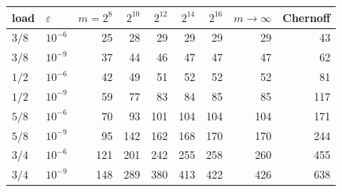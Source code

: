 \begin{tabular}{|l|l|r|r|r|r|r|r|r|}
\hline
load & $\varepsilon$ & $m{=}2^{8}$ & $2^{10}$ & $2^{12}$ & $2^{14}$ & $2^{16}$ & $m\to\infty$ & Chernoff \\
\hline
$3/8$ & $10^{-6}$ & 25 & 28 & 29 & 29 & 29 & 29 & 43 \\
$3/8$ & $10^{-9}$ & 37 & 44 & 46 & 47 & 47 & 47 & 62 \\
$1/2$ & $10^{-6}$ & 42 & 49 & 51 & 52 & 52 & 52 & 81 \\
$1/2$ & $10^{-9}$ & 59 & 77 & 83 & 84 & 85 & 85 & 117 \\
$5/8$ & $10^{-6}$ & 70 & 93 & 101 & 104 & 104 & 104 & 171 \\
$5/8$ & $10^{-9}$ & 95 & 142 & 162 & 168 & 170 & 170 & 244 \\
$3/4$ & $10^{-6}$ & 121 & 201 & 242 & 255 & 258 & 260 & 455 \\
$3/4$ & $10^{-9}$ & 148 & 289 & 380 & 413 & 422 & 426 & 638 \\
\hline
\end{tabular}
